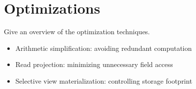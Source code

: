 \section{Optimizations}
\label{sec-optimization}

Give an overview of the optimization techniques.
\begin{itemize}
\item Arithmetic simplification: avoiding redundant computation
\item Read projection: minimizing unnecessary field access
\item Selective view materialization: controlling storage footprint
\end{itemize}